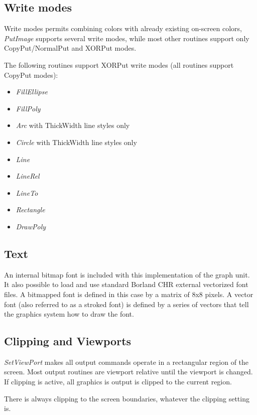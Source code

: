 \subsection{Write modes}

Write modes permits combining colors with already existing on-screen colors,
\textit{PutImage} supports several write modes, while most other routines
support only CopyPut/NormalPut and XORPut modes.

The following routines support XORPut write modes (all routines support
CopyPut modes):

\begin{itemize}
\item \textit{FillEllipse}
\item \textit{FillPoly}
\item \textit{Arc} with ThickWidth line styles only
\item \textit{Circle} with ThickWidth line styles only
\item \textit{Line}
\item \textit{LineRel}
\item \textit{LineTo}
\item \textit{Rectangle}
\item \textit{DrawPoly}
\end{itemize}

\subsection{Text}
An internal bitmap font is included with this implementation of the graph
unit. It also possible to load and use standard Borland CHR external
vectorized font files. A bitmapped font is defined in this case by
a matrix of 8x8 pixels. A vector font (also referred to as a stroked font)
is defined by a series of vectors that tell the graphics system how to draw
the font.

\subsection{Clipping and Viewports}

\textit{SetViewPort} makes all output commands operate in a rectangular
region of the screen. Most output routines are viewport relative until
the viewport is changed. If clipping is active, all graphics is output
is clipped to the current region.

There is always clipping to the screen boundaries, whatever the clipping
setting is.

